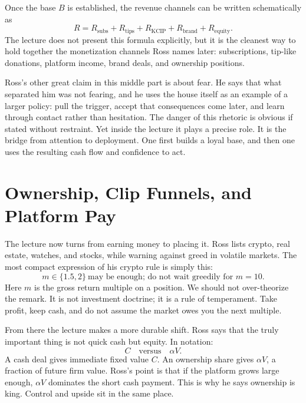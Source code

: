 Once the base \(B\) is established, the revenue channels can be written schematically as
\begin{equation}
R = R_{\text{subs}} + R_{\text{tips}} + R_{\text{KCIP}} + R_{\text{brand}} + R_{\text{equity}}.
\end{equation}
The lecture does not present this formula explicitly, but it is the cleanest way to hold together the monetization channels Ross names later: subscriptions, tip-like donations, platform income, brand deals, and ownership positions.

Ross's other great claim in this middle part is about fear. He says that what separated him was not fearing, and he uses the house itself as an example of a larger policy: pull the trigger, accept that consequences come later, and learn through contact rather than hesitation. The danger of this rhetoric is obvious if stated without restraint. Yet inside the lecture it plays a precise role. It is the bridge from attention to deployment. One first builds a loyal base, and then one uses the resulting cash flow and confidence to act.

\section{Ownership, Clip Funnels, and Platform Pay}

The lecture now turns from earning money to placing it. Ross lists crypto, real estate, watches, and stocks, while warning against greed in volatile markets. The most compact expression of his crypto rule is simply this:
\begin{equation}
m\in\{1.5,2\}\ \text{may be enough; do not wait greedily for }m=10.
\end{equation}
Here \(m\) is the gross return multiple on a position. We should not over-theorize the remark. It is not investment doctrine; it is a rule of temperament. Take profit, keep cash, and do not assume the market owes you the next multiple.

From there the lecture makes a more durable shift. Ross says that the truly important thing is not quick cash but equity. In notation:
\begin{equation}
C \quad \text{versus} \quad \alpha V.
\end{equation}
A cash deal gives immediate fixed value \(C\). An ownership share gives \(\alpha V\), a fraction of future firm value. Ross's point is that if the platform grows large enough, \(\alpha V\) dominates the short cash payment. This is why he says ownership is king. Control and upside sit in the same place.

